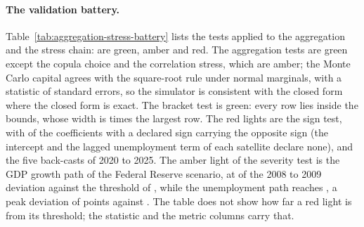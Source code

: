 

\paragraph{The validation battery.}
Table~\ref{tab:aggregation-stress-battery} lists the {\agstLightsTotal} tests applied to the aggregation and the stress chain:
{\agstLightsGreen} are green, {\agstLightsAmber} amber and {\agstLightsRed} red. The aggregation tests are green except the copula
choice and the correlation stress, which are amber; the Monte Carlo capital agrees with the square-root rule under normal
marginals, with a statistic of {\agstEllipticalZ} standard errors, so the simulator is consistent with the closed form where the
closed form is exact. The bracket test is green: every row lies inside the bounds, whose width is {\agstBracketRatio} times the largest row.
The red lights are the sign test, with {\agstWrongSigns} of the {\agstSignDeclared} coefficients with a declared sign carrying the opposite sign (the intercept and the
lagged unemployment term of each satellite declare none), and the five back-casts of 2020 to 2025. The amber light of the severity test is the GDP growth path of the Federal Reserve
scenario, at {\agstSevGdp} of the 2008 to 2009 deviation against the threshold of {\agstSevMin}, while the unemployment path
reaches {\agstSevUnemp}, a peak deviation of {\agstSevUnempPeak} points against {\agstSevUnempHist}. The table does not show how
far a red light is from its threshold; the statistic and the metric columns carry that.



